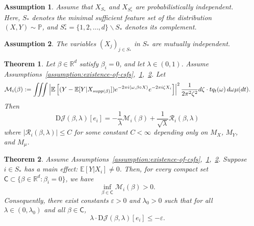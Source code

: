 \documentclass[10pt,a4paper]{amsart}
\newtheorem{assumption}{Assumption}
\newtheorem{theorem}{Theorem}
\newcommand{\E}{\mathbb{E}}
\renewcommand{\P}{\mathbb{P}}
\newcommand{\R}{\mathbb{R}}
\newcommand{\supp}{\mathop{\rm supp}}
\begin{document}
\begin{assumption}
\label{assumption:independence}
Assume that $X_{S_*}$ and $X_{S_*^c}$ are probabilistically independent. Here, $S_*$ denotes the 
minimal sufficient feature set of the distribution $(X, Y) \sim \P$, and $S_*^c = \{1, 2, \ldots, d\} \backslash S_*$ denotes its complement.
\end{assumption} 

\begin{assumption}
\label{assumption:feature-variable}
The variables $(X_j)_{j \in S_*}$ in $S_*$ are mutually independent.
\end{assumption} 

\begin{theorem} 
\label{theorem:gradient-expression-ANOVA}
Let $\beta \in \R^d$ satisfy $\beta_i = 0$, and let $\lambda \in (0, 1)$. Assume Assumptions~\ref{assumption:existence-of-csfs},~\ref{assumption:independence},~\ref{assumption:feature-variable}. Let 
\begin{equation*} 
	 \mathcal{M}_i(\beta): =  \iiint \left|\mathbb{E}\left[(Y-\E[Y|X_{\supp(\beta)}]) e^{-2\pi i \langle \omega, \beta \circ X \rangle}  e^{-2\pi i \zeta X_i}\right]\right|^2 \frac{1}{2\pi^2 \zeta^2} d\zeta \cdot t q_t(\omega) \, d\omega  \mu(dt).
\end{equation*}
Then
\begin{equation*}
	\mathrm{D}\mathcal{J}(\beta, \lambda)[e_i] = - \frac{1}{\lambda} \mathcal{M}_i(\beta) + \frac{1}{\sqrt{\lambda}}\mathcal{R}_i(\beta, \lambda)
\end{equation*}
where $|\mathcal{R}_i(\beta, \lambda)| \le C$ 
for some constant $C < \infty$ depending only on $M_X$, $M_Y$, and $M_\mu$.
\end{theorem} 

\begin{theorem}
\label{theorem:uniform-lower-bound-on-M-i-beta}
Assume Assumptions~\ref{assumption:existence-of-csfs},~\ref{assumption:independence},~\ref{assumption:feature-variable}. Suppose $i \in S_*$ has a main effect: $\E[Y|X_i] \ne 0$. Then, for every compact set $\mathsf{C} \subset \{\beta \in \R^d : \beta_i = 0\}$, we have
	\begin{equation*}
		\inf_{\beta \in \mathsf{C}} \mathcal{M}_i(\beta) > 0.
	\end{equation*}
Consequently, there exist constants $\varepsilon > 0$ and $\lambda_0 > 0$ such that for all $\lambda \in (0, \lambda_0)$ and all $\beta \in \mathsf{C}$,
\begin{equation*}
	\lambda \cdot \mathrm{D}\mathcal{J}(\beta, \lambda)[e_i] \le -\varepsilon.
\end{equation*}
\end{theorem}
\end{document}
